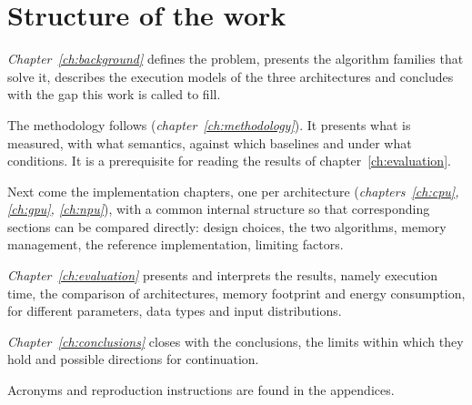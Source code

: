 \section{Structure of the work}
\label{sec:intro-outline}

\emph{Chapter~\ref{ch:background}} defines the problem, presents the algorithm
families that solve it, describes the execution models of the three
architectures and concludes with the gap this work is called to fill.

The methodology follows (\emph{chapter~\ref{ch:methodology}}). It presents what
is measured, with what semantics, against which baselines and under what
conditions. It is a prerequisite for reading the results of
chapter~\ref{ch:evaluation}.

Next come the implementation chapters, one per architecture
(\emph{chapters~\ref{ch:cpu}, \ref{ch:gpu}, \ref{ch:npu}}), with a common
internal structure so that corresponding sections can be compared directly:
design choices, the two algorithms, memory management, the reference
implementation, limiting factors.

\emph{Chapter~\ref{ch:evaluation}} presents and interprets the results, namely
execution time, the comparison of architectures, memory footprint and energy
consumption, for different parameters, data types and input distributions.

\emph{Chapter~\ref{ch:conclusions}} closes with the conclusions, the limits
within which they hold and possible directions for continuation.

Acronyms and reproduction instructions are found in the appendices.
